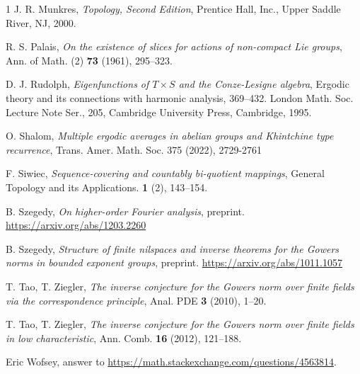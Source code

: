 \documentclass[a4paper,12pt,reqno]{amsart}
\theoremstyle{definition}
\begin{document}
\begin{thebibliography}{1}
 J. R. Munkres, \emph{Topology, Second Edition}, Prentice Hall, Inc., Upper Saddle River, NJ, 2000.

 R. S. Palais, \emph{On the existence of slices for actions of non-compact Lie groups},  Ann. of Math. (2) \textbf{73} (1961), 295--323. 

 D. J. Rudolph, \emph{Eigenfunctions of $T\times S$ and the Conze-Lesigne algebra}, Ergodic theory and its connections with harmonic analysis, 369–432. London Math. Soc. Lecture Note Ser., 205, Cambridge University Press, Cambridge, 1995.

 O. Shalom, \emph{Multiple ergodic averages in abelian groups and Khintchine type recurrence}, Trans. Amer. Math. Soc. 375 (2022), 2729-2761 

 F. Siwiec, \emph{Sequence-covering and countably bi-quotient mappings}, General Topology and its Applications. \textbf{1} (2), 143--154.

 B. Szegedy, \emph{On higher-order Fourier analysis}, preprint. \url{https://arxiv.org/abs/1203.2260}

 B. Szegedy, \emph{Structure of finite nilspaces and inverse theorems for the Gowers norms in bounded exponent groups}, preprint. \url{https://arxiv.org/abs/1011.1057}

 T. Tao, T. Ziegler, \emph{The inverse conjecture for the Gowers norm over finite fields via the correspondence principle}, Anal. PDE \textbf{3} (2010), 1--20.

 T. Tao, T. Ziegler, \emph{The inverse conjecture for the Gowers norm over finite fields in low characteristic}, Ann. Comb. \textbf{16} (2012), 121--188.

 Eric Wofsey, answer to  \url{https://math.stackexchange.com/questions/4563814}.
\end{thebibliography}
\end{document}
